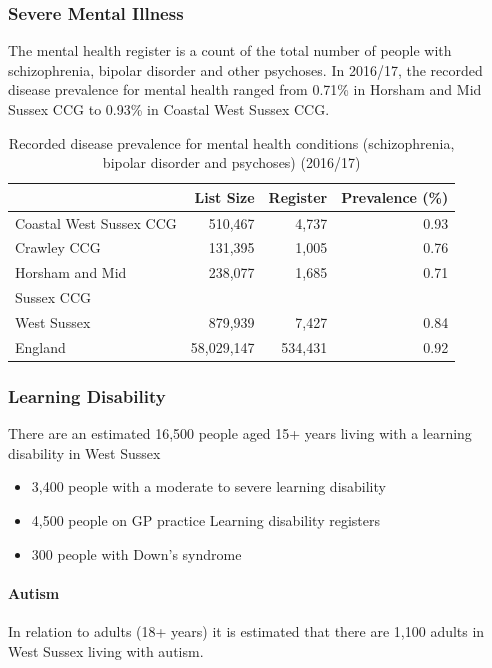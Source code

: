  
\subsubsection{Severe Mental Illness} The mental health register is a count of the total number of people with schizophrenia, bipolar disorder and other psychoses. In 2016/17, the recorded disease prevalence for mental health ranged from 0.71\% in Horsham and Mid Sussex CCG to 0.93\% in Coastal West Sussex CCG.

\begin{table}
    \caption{Recorded disease prevalence for mental health conditions (schizophrenia, bipolar disorder and psychoses) (2016/17)}
    \centering
    \begin{tabular}{lrrr}
        \toprule
        \ & List Size & Register & Prevalence (\%) \\
        \midrule
        Coastal West Sussex CCG & 510,467 & 4,737 & 0.93 \\
        Crawley CCG & 131,395 & 1,005 & 0.76 \\
        Horsham and Mid & 238,077 & 1,685 & 0.71 \\
        Sussex CCG & \ & \ & \ \\
        West Sussex & 879,939 & 7,427 & 0.84 \\
        England & 58,029,147 & 534,431 & 0.92 \\
        \bottomrule
    \end{tabular}
    \label{tab:wa:mhc}
\end{table}

\subsubsection{Learning Disability} There are an estimated 16,500 people aged 15+ years living with a learning disability in West Sussex

\begin{itemize}
    \item 3,400 people with a moderate to severe learning disability
    \item 4,500 people on GP practice Learning disability registers
    \item 300 people with Down's syndrome
\end{itemize}

\paragraph{Autism} In relation to adults (18+ years) it is estimated that there are 1,100 adults in West Sussex living with autism.

